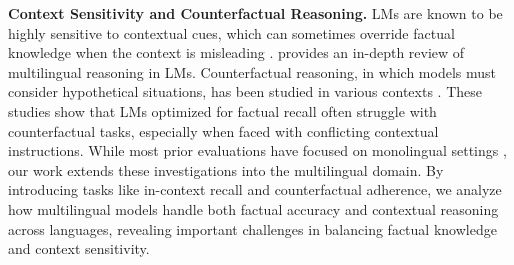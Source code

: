 \textbf{Context Sensitivity and Counterfactual Reasoning.} LMs are known to be highly sensitive to contextual cues, which can sometimes override factual knowledge when the context is misleading \cite{brown2020language, tirumala2022memorization, cotterellcontext}. \cite{ghosh2025multilingualmindsurvey} provides an in-depth review of multilingual reasoning in LMs. Counterfactual reasoning, in which models must consider hypothetical situations, has been studied in various contexts \cite{wu2023reasoning}. These studies show that LMs optimized for factual recall often struggle with counterfactual tasks, especially when faced with conflicting contextual instructions. While most prior evaluations have focused on monolingual settings \cite{shwartz-etal-2020-unsupervised, wang2020language}, our work extends these investigations into the multilingual domain. By introducing tasks like in-context recall and counterfactual adherence, we analyze how multilingual models handle both factual accuracy and contextual reasoning across languages, revealing important challenges in balancing factual knowledge and context sensitivity.



